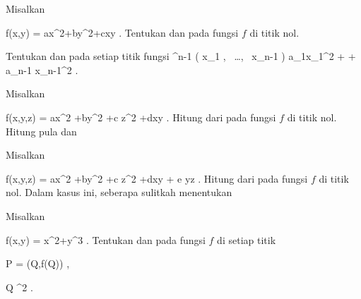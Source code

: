 \setcounter{section}{5}


{}
{

Misalkan

\mavergleichskettedisp
{\vergleichskette
{ f(x,y)
}
{ =} { ax^2+by^2+cxy
}
{ } {
}
{ } {
}
{ } {
}
}
{}{}{.}
Tentukan
dan
pada
fungsi $f$ di titik nol.

}
{} {}

{}
{

Tentukan
dan
pada setiap titik
fungsi
 {\R^{n-1}} {\R
} { \left(  x_1   , \,   \ldots  , \,   x_{n-1}                 \right) } { a_1x_1^2  + \cdots + a_{n-1} x_{n-1}^2
} {.}

}
{} {}

{}
{

Misalkan

\mavergleichskettedisp
{\vergleichskette
{ f(x,y,z)
}
{ =} { ax^2 +by^2 +c z^2 +dxy
}
{ } {
}
{ } {
}
{ } {
}
}
{}{}{.}
Hitung
dari
pada
fungsi $f$ di titik nol. Hitung pula
dan

}
{} {}

{}
{

Misalkan

\mavergleichskettedisp
{\vergleichskette
{ f(x,y,z)
}
{ =} { ax^2 +by^2 +c z^2 +dxy + e yz
}
{ } {
}
{ } {
}
{ } {
}
}
{}{}{.}
Hitung
dari
pada
fungsi $f$ di titik nol. Dalam kasus ini, seberapa sulitkah menentukan

}
{} {}

{}
{

Misalkan

\mavergleichskettedisp
{\vergleichskette
{ f(x,y)
}
{ =} { x^2+y^3
}
{ } {
}
{ } {
}
{ } {
}
}
{}{}{.}
Tentukan
dan
pada
fungsi $f$ di setiap titik

\mavergleichskette
{\vergleichskette
{ P
}
{ = }{ (Q,f(Q))
}
{  }{
}
{    }{
}
{   }{
}
}
{}{}{,}

\mavergleichskette
{\vergleichskette
{ Q
}
{ \in }{ \R^2
}
{  }{
}
{    }{
}
{   }{
}
}
{}{}{.}

}
{} {}

